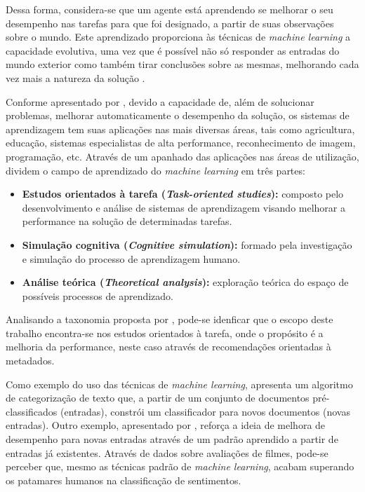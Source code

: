 \documentclass[12pt, openright, oneside, a4paper, brazil]{abntex2}
\begin{document}
Dessa forma, considera-se que um agente está aprendendo se melhorar o seu desempenho nas tarefas para que foi designado, a partir de suas observações sobre o mundo. Este aprendizado proporciona às técnicas de \textit{machine learning} a capacidade evolutiva, uma vez que é possível não só responder as entradas do mundo exterior como também tirar conclusões sobre as mesmas, melhorando cada vez mais a natureza da solução \cite{russell2004inteligencia}.

Conforme apresentado por , devido a capacidade de, além de solucionar problemas, melhorar automaticamente o desempenho da solução, os sistemas de aprendizagem tem suas aplicações nas mais diversas áreas, tais como agricultura, educação, sistemas especialistas de alta performance, reconhecimento de imagem, programação, etc. Através de um apanhado das aplicações nas áreas de utilização,  dividem o campo de aprendizado do \textit{machine learning} em três partes:

\begin{itemize}

	\item \textbf{Estudos orientados à tarefa (\textit{Task-oriented studies}):} composto pelo desenvolvimento e análise de sistemas de aprendizagem visando melhorar a performance na solução de determinadas tarefas.

	\item \textbf{Simulação cognitiva (\textit{Cognitive simulation}):} formado pela investigação e simulação do processo de aprendizagem humano.

	\item \textbf{Análise teórica (\textit{Theoretical analysis}):} exploração teórica do espaço de possíveis processos de aprendizado.

\end{itemize}

Analisando a taxonomia proposta por , pode-se idenficar que o escopo deste trabalho encontra-se nos estudos orientados à tarefa, onde o propósito é a melhoria da performance, neste caso através de recomendações orientadas à metadados.

Como exemplo do uso das técnicas de \textit{machine learning},   apresenta um algoritmo de categorização de texto que, a partir de um conjunto de documentos pré-classificados (entradas), constrói um classificador para novos documentos (novas entradas). Outro exemplo, apresentado por , reforça a ideia de melhora de desempenho para novas entradas através de um padrão aprendido a partir de entradas já existentes. Através de dados sobre avaliações de filmes, pode-se perceber que, mesmo as técnicas padrão de \textit{machine learning}, acabam superando os patamares humanos na classificação de sentimentos.
\end{document}
